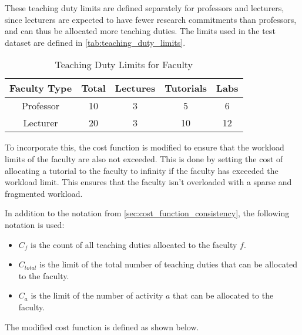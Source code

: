 These teaching duty limits are defined separately for professors and lecturers, since lecturers are expected to have fewer research commitments than professors, and can thus be allocated more teaching duties. The limits used in the test dataset are defined in \autoref{tab:teaching_duty_limits}.

\begin{table}[H]
  \centering
  \begin{tabular}{|c|c|c|c|c|}
    \hline
    Faculty Type & Total & Lectures & Tutorials & Labs \\ \hline
    Professor    & 10    & 3        & 5         & 6    \\ \hline
    Lecturer     & 20    & 3        & 10        & 12   \\ \hline
  \end{tabular}
  \caption{Teaching Duty Limits for Faculty}
  \label{tab:teaching_duty_limits}
\end{table}

To incorporate this, the cost function is modified to ensure that the workload limits of the faculty are also not exceeded. This is done by setting the cost of allocating a tutorial to the faculty to infinity if the faculty has exceeded the workload limit. This ensures that the faculty isn't overloaded with a sparse and fragmented workload.

In addition to the notation from \autoref{sec:cost_function_consistency}, the following notation is used:

\begin{itemize}
  \item $C_f$ is the count of all teaching duties allocated to the faculty $f$.
  \item $C_{total}$ is the limit of the total number of teaching duties that can be allocated to the faculty.
  \item $C_a$ is the limit of the number of activity $a$ that can be allocated to the faculty.
\end{itemize}

The modified cost function is defined as shown below.

